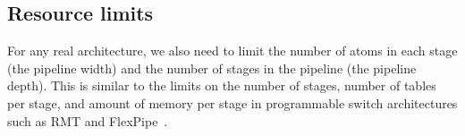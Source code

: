 \subsection{Resource limits}
\label{s:resource}

For any real architecture, we also need to limit the number of atoms
in each stage (the pipeline width) and the number of stages in the
pipeline (the pipeline depth). This is similar to the limits on the
number of stages, number of tables per stage, and amount of memory per
stage in programmable switch architectures such as RMT and
FlexPipe~\cite{lavanya_compiler}.
